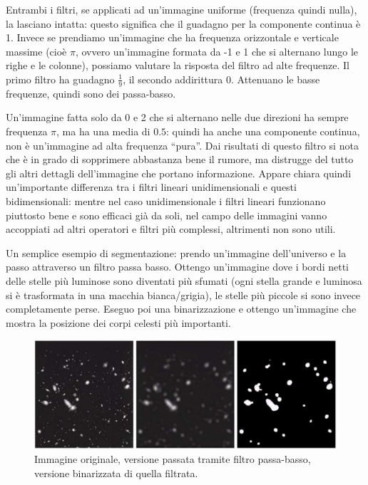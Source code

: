 \documentclass[a4paper,11pt]{article}
\begin{document}
Entrambi i filtri, se applicati ad un'immagine uniforme (frequenza quindi nulla), la lasciano intatta: questo significa che il guadagno per la componente continua
è 1. Invece se prendiamo un'immagine che ha frequenza orizzontale e verticale massime (cioè $\pi$, ovvero un'immagine formata da -1 e 1 che si alternano
lungo le righe e le colonne), possiamo valutare la risposta del filtro ad alte frequenze. Il primo filtro ha guadagno
$\frac{1}{9}$, il secondo addirittura $0$. Attenuano le basse frequenze, quindi sono dei passa-basso.
\par
Un'immagine fatta solo da 0 e 2 che si alternano nelle due direzioni ha sempre frequenza $\pi$, ma ha una media
di $0.5$: quindi ha anche una componente continua, non è un'immagine ad alta frequenza ``pura''.
Dai risultati di questo filtro si nota che è in grado di sopprimere abbastanza bene il rumore, ma distrugge del tutto gli altri dettagli dell'immagine che portano
informazione. Appare chiara quindi un'importante differenza tra i filtri lineari unidimensionali e questi bidimensionali: mentre nel caso
unidimensionale i filtri lineari funzionano piuttosto bene e sono efficaci già da soli, nel campo delle immagini vanno accoppiati ad altri
operatori e filtri più complessi, altrimenti non sono utili.
\par
Un semplice esempio di segmentazione: prendo un'immagine dell'universo e la passo attraverso un filtro passa basso. Ottengo un'immagine dove
i bordi netti delle stelle più luminose sono diventati più sfumati (ogni stella grande e luminosa si è trasformata in una macchia bianca/grigia),
le stelle più piccole si sono invece completamente perse. Eseguo poi una binarizzazione e ottengo un'immagine che mostra la posizione dei corpi celesti più importanti.

\renewcommand{\thefigure}{5.27}
\begin{figure}[!h]
  \centering
    \includegraphics[scale=0.4]{images/5/universe.png}
    \caption{Immagine originale, versione passata tramite filtro passa-basso, versione binarizzata di quella filtrata.}
\end{figure}
\end{document}
